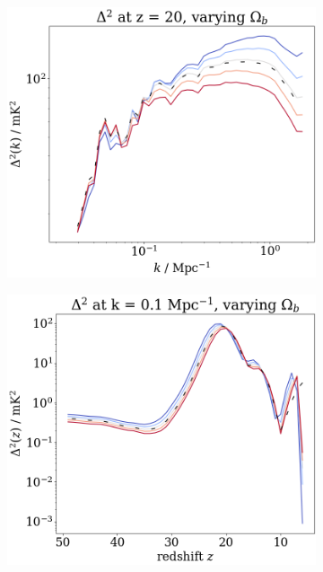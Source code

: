 \documentclass[floats,floatfix,showpacs,amssymb,prd,superscriptaddress,nofootinbib]{revtex4-2} %
\begin{document}
\begin{figure}[H]
\begin{subfigure}[b]{0.45\textwidth}
         \includegraphics[width=\textwidth]{images/simulation_results/power_spectrum_fixed_z_20_Ob.png}
         \label{fig:power_spectrum_fixed_z_20_Ob}
     \end{subfigure}
     \hfill
     \begin{subfigure}[b]{0.45\textwidth}
         \centering
         \includegraphics[width=\textwidth]{images/simulation_results/power_spectrum_fixed_k_0.1_Ob.png}
         \label{fig:power_spectrum_fixed_k_0.1_Ob}

\end{subfigure}
\end{figure}
\end{document}
